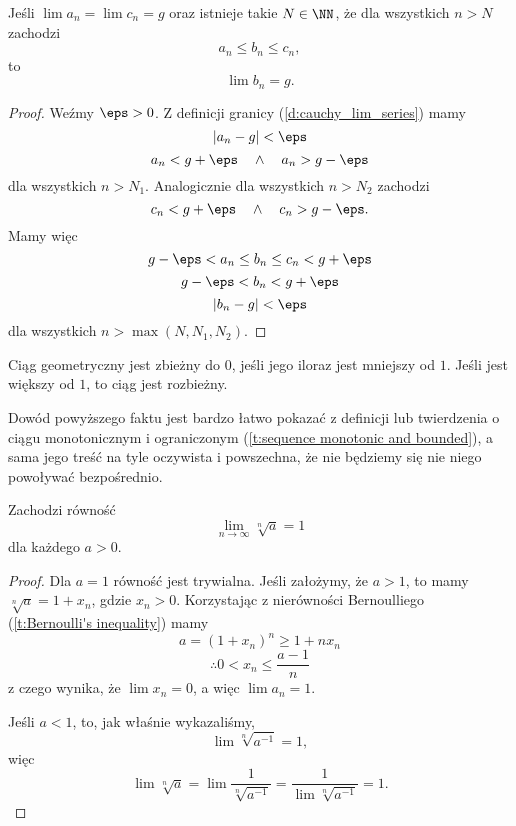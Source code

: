 \begin{theorem}
    \label{t:sequence squeeze theorem}
    Jeśli $\lim a_n = \lim c_n = g$ oraz istnieje takie $N \in \NN$, że dla wszystkich $n > N$ zachodzi
    \[ a_n \leq b_n \leq c_n, \]
    to
    \[ \lim b_n = g. \]
\end{theorem}
\begin{proof}
    Weźmy $\eps > 0$. Z definicji granicy (\ref{d:cauchy_lim_series}) mamy
    \[ |a_n - g| < \eps \]
    \[ a_n < g + \eps \quad\land\quad a_n > g - \eps \]
    dla wszystkich $n > N_1$.
    Analogicznie dla wszystkich $n > N_2$ zachodzi
    \[ c_n < g + \eps \quad\land\quad c_n > g - \eps. \]
    Mamy więc
    \[ g - \eps < a_n \leq b_n \leq c_n < g + \eps \]
    \[ g - \eps < b_n < g + \eps \]
    \[ |b_n - g| < \eps \]
    dla wszystkich $n > \max(N, N_1, N_2)$.
\end{proof}

\begin{fact}
    Ciąg geometryczny jest zbieżny do $0$, jeśli jego iloraz jest mniejszy od $1$. Jeśli jest większy od $1$, to ciąg jest rozbieżny.
\end{fact}
Dowód powyższego faktu jest bardzo łatwo pokazać z definicji lub twierdzenia o ciągu monotonicznym i ograniczonym (\ref{t:sequence monotonic and bounded}), a sama jego treść na tyle oczywista i powszechna, że nie będziemy się nie niego powoływać bezpośrednio.

\begin{theorem}
    \label{t:(a)^(1/n)->1}
    Zachodzi równość
    \[ \lim_{n \to \infty}\sqrt[n]{a} = 1 \]
    dla każdego $a > 0$.
\end{theorem}
\begin{proof}
    Dla $a = 1$ równość jest trywialna. Jeśli założymy, że $a > 1$, to mamy $\sqrt[n]{a} = 1 + x_n$, gdzie $x_n > 0$. Korzystając z nierówności Bernoulliego (\ref{t:Bernoulli's inequality}) mamy
    \[ a = (1 + x_n)^n \geq 1 + nx_n \]
    \[ \therefore 0 < x_n \leq \frac{a - 1}{n} \]
    z czego wynika, że $\lim x_n = 0$, a więc $\lim a_n = 1$.

    Jeśli $a < 1$, to, jak właśnie wykazaliśmy,
    \[ \lim \sqrt[n]{a^{-1}} = 1, \]
    więc
    \[ \lim \sqrt[n]{a} = \lim \frac{1}{\sqrt[n]{a^{-1}}} = \frac{1}{\lim\sqrt[n]{a^{-1}}} = 1. \]
\end{proof}

